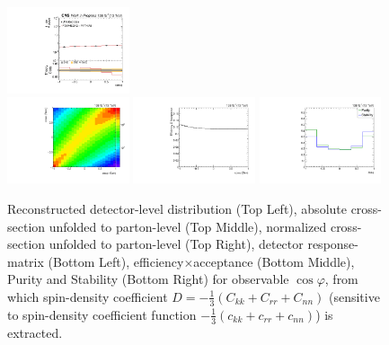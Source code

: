 \begin{refsection}
\begin{figure}[htb]
\begin{center}
 \includegraphics[width=0.32\textwidth]{fig_fullRun2UL/unfolding/combined/UnfoldedResultsNorm_ll_cHel.pdf} \\
 \includegraphics[width=0.32\textwidth]{fig_fullRun2UL/unfolding/combined/ResponseMatrix_ll_cHel.pdf}
 \includegraphics[width=0.32\textwidth]{fig_fullRun2UL/unfolding/combined/TotEff_ll_cHel.pdf}
 \includegraphics[width=0.32\textwidth]{fig_fullRun2UL/unfolding/combined/PurStab_ll_cHel.pdf} \\
\caption{Reconstructed detector-level distribution (Top Left), absolute cross-section unfolded to parton-level (Top Middle), normalized cross-section unfolded to parton-level (Top Right), detector response-matrix (Bottom Left), efficiency$\times$acceptance (Bottom Middle), Purity and Stability (Bottom Right) for  observable $\cos\varphi$, from which spin-density coefficient $D = -\frac{1}{3}(C_{kk} + C_{rr} + C_{nn})$ (sensitive to spin-density coefficient function $-\frac{1}{3}(c_{kk} + c_{rr} + c_{nn})$) is extracted.}
\label{fig:ll_cHel}
\end{center}
\end{figure}
\clearpage
\begin{figure}[htb]
\begin{center}

\end{center}
\end{figure}
\end{refsection}
